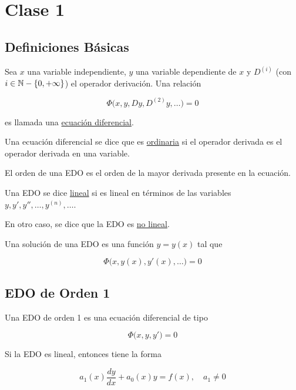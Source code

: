 \section{Clase 1}
\subsection{Definiciones Básicas}

\begin{defn}
    Sea $x$ una variable independiente, $y$ una variable dependiente de $x$ y $D^{(i)}$ (con $i \in \mathbb{N} - \{0, +\infty\}$) el operador derivación. Una relación
    
    \[
    \Phi\big( x, y, Dy, D^{(2)}y, \dots \big) = 0
    \]

    es llamada una \ul{ecuación diferencial}.

    Una ecuación diferencial se dice que es \ul{ordinaria} si el operador derivada es el operador derivada en una variable.
\end{defn}

\begin{defn}
    El orden de una EDO es el orden de la mayor derivada presente en la ecuación.
\end{defn}

\begin{defn}
    Una EDO se dice \ul{lineal} si es lineal en términos de las variables $y, y', y'', \dots, y^{(n)}, \dots$.

    En otro caso, se dice que la EDO es \ul{no lineal}.
\end{defn}

\begin{defn}
    Una solución de una EDO es una función $y = y(x)$ tal que

    \[
    \Phi\big( x, y(x), y'(x), \dots \big) = 0
    \]
\end{defn}

\subsection*{EDO de Orden 1}

\begin{defn}
    Una EDO de orden 1 es una ecuación diferencial de tipo

    \[
    \Phi\big( x, y, y' \big) = 0
    \]

    Si la EDO es lineal, entonces tiene la forma

    \[
    a_1(x)\frac{dy}{dx} + a_0(x)y = f(x), \quad a_1 \neq 0
    \]
\end{defn}

